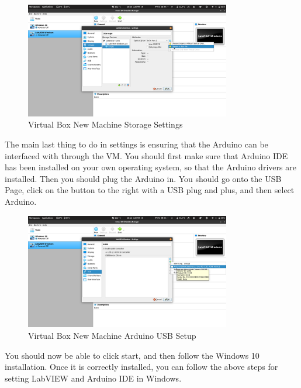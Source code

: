 \documentclass[a4paper,11pt]{report}
\begin{document}
\begin{figure}[H]
\centering
\includegraphics[width=0.8\textwidth]{screenshots/virtualboxstoragesettings}
\caption{Virtual Box New Machine Storage Settings}
\end{figure}

The main last thing to do in settings is ensuring that the Arduino can be interfaced with through the VM. You should first make sure that Arduino IDE has been installed on your own operating system, so that the Arduino drivers are installed. Then you should plug the Arduino in. You should go onto the USB Page, click on the button to the right with a USB plug and plus, and then select Arduino.

\begin{figure}[H]
\centering
\includegraphics[width=0.8\textwidth]{screenshots/virtualboxusbarduino}
\caption{Virtual Box New Machine Arduino USB Setup}
\end{figure}

You should now be able to click start, and then follow the Windows 10 installation. Once it is correctly installed, you can follow the above steps for setting LabVIEW and Arduino IDE in Windows.

\vspace*{1\baselineskip}

\printnoidxglossary[sort=word]
\end{document}
